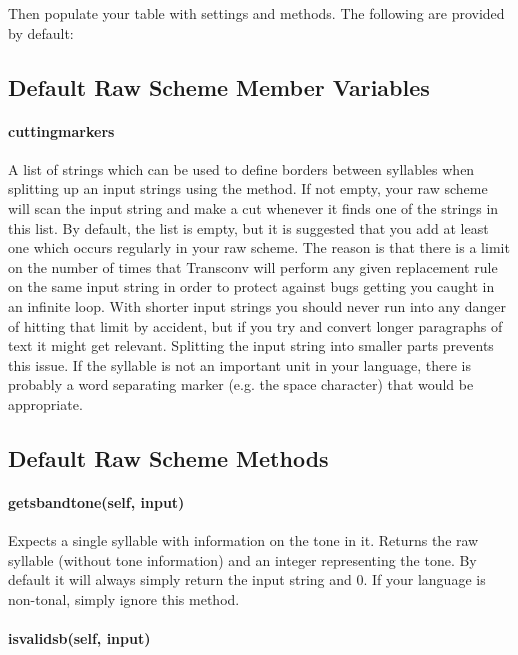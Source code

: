 \documentclass{ltxdockit}
\begin{document}
Then populate your table with settings and methods. The following are provided
by default:

\subsection{Default Raw Scheme Member Variables}

\paragraph{cutting\textunderscore{}markers}

A list of strings which can be used to define borders between syllables when
splitting up an input strings using the  method.
If not empty, your raw scheme will scan the input string and make a cut whenever
it finds one of the strings in this list. By default, the list is empty, but it
is suggested that you add at least one which occurs regularly in your raw
scheme. The reason is that there is a limit on the number of times that
Transconv will perform any given replacement rule on the same input string in
order to protect against bugs getting you caught in an infinite loop. With
shorter input strings you should never run into any danger of hitting that limit
by accident, but if you try and convert longer paragraphs of text it might get
relevant. Splitting the input string into smaller parts prevents this issue. If
the syllable is not an important unit in your language, there is probably a word
separating marker (e.g. the space character) that would be appropriate.

\subsection{Default Raw Scheme Methods}

\paragraph{get\textunderscore{}sb\textunderscore{}and\textunderscore{}tone(self,
input)}

Expects a single syllable with information on the tone in it. Returns the raw
syllable (without tone information) and an integer representing the tone. By
default it will always simply return the input string and 0. If your language is
non-tonal, simply ignore this method.

\paragraph{is\textunderscore{}valid\textunderscore{}sb(self, input)}
\end{document}
